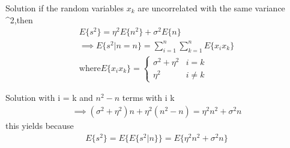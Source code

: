 \documentclass{beamer}
\begin{document}
\begin{frame}{Solution}
if the random variables $x_k$ are uncorrelated with the same variance \sigma^2,then\\
\begin{align}
 E\{s^2\} = \eta^2 E\{n^2\} + \sigma^2 E\{n\}\\
 \implies E\{s^2|n=n\} = \sum_{i=1}^{n}\sum_{k=1}^{n}E\{x_ix_k\}\\
 \text{where} E\{x_ix_k\} =\begin{cases}
  \sigma^2 + \eta^2 & i = k \\
 \eta^2 & i \neq k
 \end{cases}
\end{align}
\end{frame}
\begin{frame}{Solution}
    with i = k and $ n^2 - n$ terms with i \neq k \\
     \begin{align}
\implies (\sigma^2+\eta^2)n + \eta^2(n^2-n) = \eta^2 n^2 + \sigma^2 n 
 \end{align}
 this yields because\\
 \begin{align}
  E\{s^2\} = E\{E\{s^2|n\}\} = E\{\eta^2 n^2 + \sigma^2 n\}
  \end{align}
\end{frame}
\end{document}
